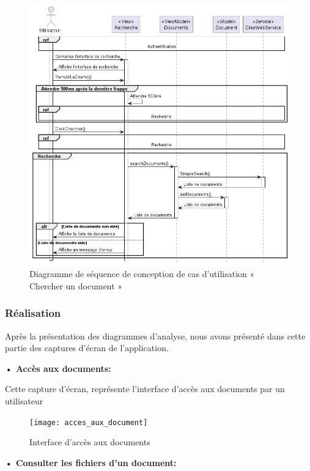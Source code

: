 \begin{figure}[H]
  \centering
  \includegraphics[width=1\textwidth]{out/diagrams/documents/sequence_chercher/sequence_chercher}
  \caption{Diagramme de séquence de conception de cas d'utilisation « Chercher un document »}
  \label{fig:sequence_conception_charcherDocument}
\end{figure}

\subsubsection{Réalisation}

Après la présentation des diagrammes d'analyse, nous avons présenté dans cette partie des captures d'écran de l'application.

\textbf{•	Accès aux documents:}

Cette capture d'écran, représente l'interface d'accès aux documents par un utilisateur

\begin{figure}[H]
  \centering
  \texttt{[image: acces\_aux\_document]}
  \caption{Interface d'accès aux documents}
  \label{fig:acces_aux_document}
\end{figure}

\textbf{•	Consulter les fichiers d'un document:}

